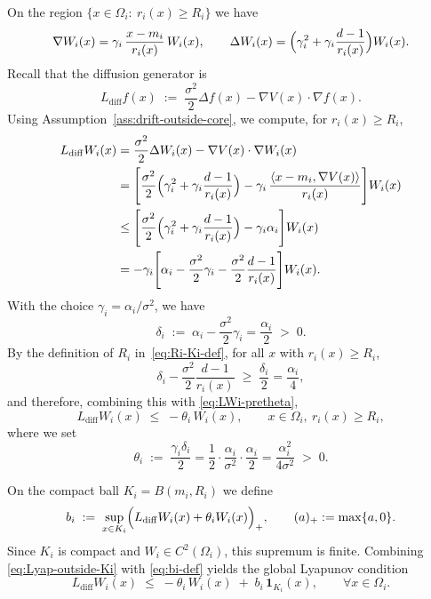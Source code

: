 On the region \(\{x\in\Omega_i:\ r_i(x)\ge R_i\}\) we have
\[
\nabla W_i(x)
=
\gamma_i\,\frac{x-m_i}{r_i(x)}\,W_i(x),
\qquad
\Delta W_i(x)
=
\Bigl(\gamma_i^2 + \gamma_i\frac{d-1}{r_i(x)}\Bigr)W_i(x).
\]
Recall that the diffusion generator is
\[
L_{\mathrm{diff}} f(x)
\;:=\;
\frac{\sigma^2}{2}\Delta f(x) - \nabla V(x)\cdot\nabla f(x).
\]
Using Assumption~\ref{ass:drift-outside-core}, we compute, for \(r_i(x)\ge R_i\),
\begin{align}
L_{\mathrm{diff}} W_i(x)
&=
\frac{\sigma^2}{2}\Delta W_i(x) - \nabla V(x)\cdot\nabla W_i(x)\nonumber\\
&=
\Biggl[
\frac{\sigma^2}{2}\Bigl(\gamma_i^2 + \gamma_i\frac{d-1}{r_i(x)}\Bigr)
- \gamma_i\,\frac{\langle x-m_i,\nabla V(x)\rangle}{r_i(x)}
\Biggr] W_i(x)\nonumber\\
&\le
\Biggl[
\frac{\sigma^2}{2}\Bigl(\gamma_i^2 + \gamma_i\frac{d-1}{r_i(x)}\Bigr)
- \gamma_i\alpha_i
\Biggr] W_i(x)\nonumber\\
&=
-\gamma_i
\Biggl[
\alpha_i
- \frac{\sigma^2}{2}\gamma_i
- \frac{\sigma^2}{2}\frac{d-1}{r_i(x)}
\Biggr] W_i(x).\label{eq:LWi-pretheta}
\end{align}
With the choice \(\gamma_i=\alpha_i/\sigma^2\), we have
\begin{equation}\label{eq:delta-i-def}
\delta_i
\;:=\;
\alpha_i - \frac{\sigma^2}{2}\gamma_i
=
\frac{\alpha_i}{2}
\;>\;0.
\end{equation}
By the definition of \(R_i\) in~\eqref{eq:Ri-Ki-def},
for all \(x\) with \(r_i(x)\ge R_i\),
\[
\delta_i - \frac{\sigma^2}{2}\frac{d-1}{r_i(x)}
\;\ge\;
\frac{\delta_i}{2}
=
\frac{\alpha_i}{4},
\]
and therefore, combining this with \eqref{eq:LWi-pretheta},
\begin{equation}\label{eq:Lyap-outside-Ki}
L_{\mathrm{diff}} W_i(x)
\;\le\;
-\theta_i\,W_i(x),
\qquad
x\in\Omega_i,\ r_i(x)\ge R_i,
\end{equation}
where we set
\begin{equation}\label{eq:theta-i-def}
\theta_i
\;:=\;
\frac{\gamma_i\delta_i}{2}
=
\frac{1}{2}\cdot\frac{\alpha_i}{\sigma^2}\cdot\frac{\alpha_i}{2}
=
\frac{\alpha_i^2}{4\sigma^2}
\;>\;0.
\end{equation}

On the compact ball \(K_i=B(m_i,R_i)\) we define
\begin{equation}\label{eq:bi-def}
b_i
\;:=\;
\sup_{x\in K_i}
\Bigl(
L_{\mathrm{diff}} W_i(x) + \theta_i W_i(x)
\Bigr)_+,
\qquad
(a)_+ := \max\{a,0\}.
\end{equation}
Since \(K_i\) is compact and \(W_i\in C^2(\Omega_i)\), this supremum is finite.
Combining \eqref{eq:Lyap-outside-Ki} with \eqref{eq:bi-def} yields the global
Lyapunov condition
\begin{equation}\label{eq:Lyap-full-Ki}
L_{\mathrm{diff}} W_i(x)
\;\le\;
-\theta_i\,W_i(x)
\;+\;
b_i\,\mathbf 1_{K_i}(x),
\qquad
\forall x\in\Omega_i.
\end{equation}


